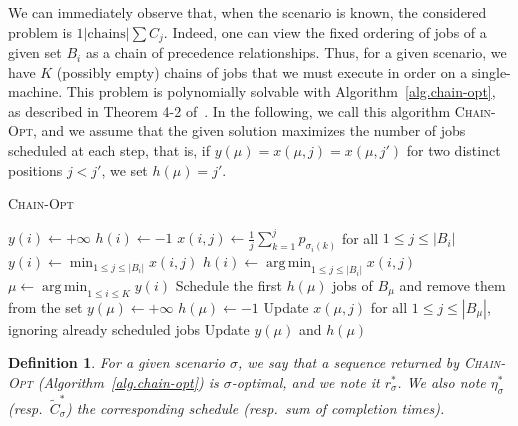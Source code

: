 \documentclass{article}
\newtheorem{definition}{Definition}
\DeclareMathOperator*{\argmin}{arg\,min}
\begin{document}
We can immediately observe that, when the scenario is known, the considered problem is \(1|\text{chains}|\sum C_j\).
Indeed, one can view the fixed ordering of jobs of a given set \(B_i\) as a chain of precedence relationships.
Thus, for a given scenario, we have \(K\) (possibly empty) chains of jobs that we must execute in order on a single-machine.
This problem is polynomially solvable with Algorithm~\ref{alg.chain-opt}, as described in Theorem 4-2 of~\cite{conway1967theory}.
In the following, we call this algorithm \textsc{Chain-Opt}, and we assume that the given solution maximizes the number of jobs scheduled at each step, that is, if \(y(\mu)=x(\mu,j)=x(\mu,j')\) for two distinct positions \(j<j'\), we set \(h(\mu)=j'\).

\begin{algorithm}[htbp]
    \caption{\textsc{Chain-Opt}}
    \label{alg.chain-opt}
    \begin{algorithmic}[1]
                \State \(y(i)\gets +\infty\)
                \State \(h(i)\gets -1\)
            \Else
                \State \(x(i,j)\gets \frac{1}{j}\sum_{k=1}^j p_{\sigma_i(k)}\) for all \(1\le j\le |B_i|\)
                \State \(y(i)\gets \min_{1\le j\le |B_i|} x(i,j)\)
                \State \(h(i)\gets \argmin_{1\le j\le |B_i|} x(i,j)\)
            \EndIf
        \EndFor
            \State \(\mu\gets\argmin_{1\le i\le K} y(i)\)
            \State Schedule the first \(h(\mu)\) jobs of \(B_\mu\) and remove them from the set
                \State \(y(\mu)\gets +\infty\)
                \State \(h(\mu)\gets -1\)
            \Else
                \State Update \(x(\mu,j)\) for all \(1\le j\le |B_\mu|\), ignoring already scheduled jobs
                \State Update \(y(\mu)\) and \(h(\mu)\)
            \EndIf
        \EndWhile
    \end{algorithmic}
\end{algorithm}

\begin{definition}
    For a given scenario \(\sigma\), we say that a sequence returned by \textsc{Chain-Opt} (Algorithm~\ref{alg.chain-opt}) is \(\sigma\)-optimal, and we note it \(r^*_\sigma\).
    We also note \(\eta^*_\sigma\) (resp.\ \(\tilde{C}^*_\sigma\)) the corresponding schedule (resp.\ sum of completion times).
\end{definition}
\end{document}

